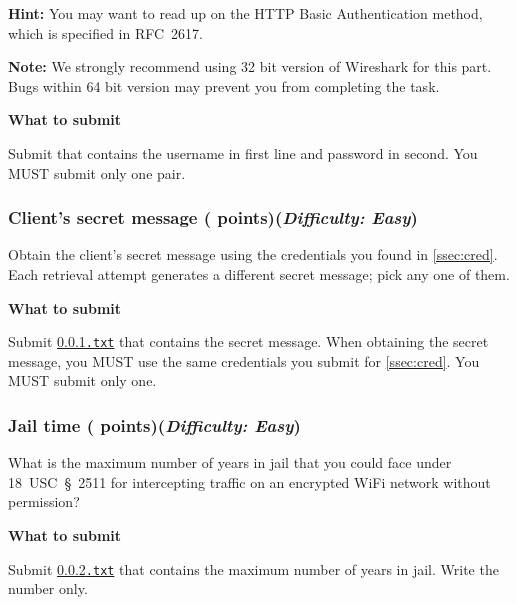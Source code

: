 \textbf{Hint:} You may want to read up on the HTTP Basic Authentication method, which is specified in RFC~2617.

\textbf{Note:} We strongly recommend using 32 bit version of Wireshark for this part. Bugs within 64 bit version may prevent you from completing the task.

\smallskip

\hypertarget{cp2cred}{\textbf{What to submit}\hspace{10pt}}
Submit \texttt{\hyperlink{credformat}{\filecred}} that contains the username in first line and password in second.
You MUST submit only one pair.

\subsubsection{Client's secret message ( points)\hfill\rm\normalsize (\emph{Difficulty: Easy})}
\label{ssec:secret}
\newcommand{\filesecret}{\ref*{ssec:secret}.txt}

Obtain the client's secret message using the credentials you found in \ref{ssec:cred}.
Each retrieval attempt generates a different secret message; pick any one of them.

\smallskip

\hypertarget{cp2secret}{\textbf{What to submit}\hspace{10pt}}
Submit \texttt{\hyperlink{secretformat}{\filesecret}} that contains the secret message.
When obtaining the secret message, you MUST use the same credentials you submit for \ref{ssec:cred}.
You MUST submit only one.

\subsubsection{Jail time ( points)\hfill\rm\normalsize (\emph{Difficulty: Easy})}
\label{ssec:jailtime}
\newcommand{\filejailtime}{\ref*{ssec:jailtime}.txt}

What is the maximum number of years in jail that you could face under 18~USC~\S~2511 for intercepting traffic on an encrypted WiFi network without permission?

\smallskip

\hypertarget{cp2jailtime}{\textbf{What to submit}\hspace{10pt}}
Submit \texttt{\hyperlink{jailtimeformat}{\filejailtime}} that contains the maximum number of years in jail.
Write the number only.

